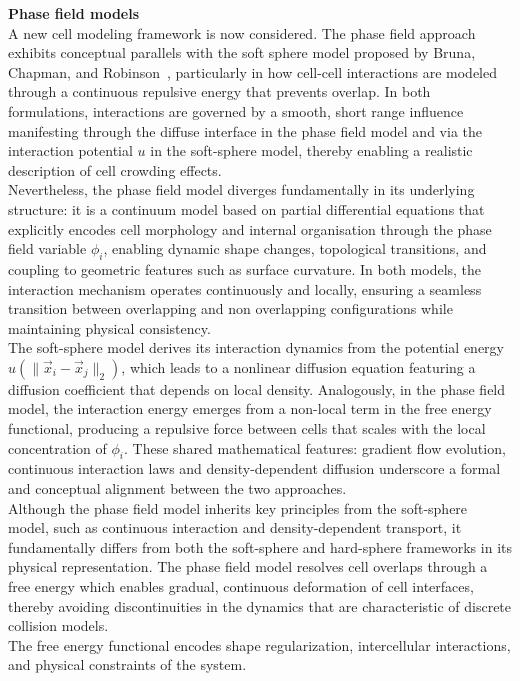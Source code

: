 \textbf{Phase field models} \\
A new cell modeling framework is now considered. 
The phase field approach exhibits conceptual parallels with the soft sphere model proposed by Bruna, Chapman, and Robinson~\cite{Bruna2017}, particularly in how cell-cell interactions are modeled through a continuous repulsive energy that prevents overlap. 
In both formulations, interactions are governed by a smooth, short range influence manifesting through the diffuse interface in the phase field model and via the interaction potential $u$ in the soft-sphere model, thereby enabling a realistic description of cell crowding effects. \\
Nevertheless, the phase field model diverges fundamentally in its underlying structure: it is a continuum model based on partial differential equations that explicitly encodes cell morphology and internal organisation through the phase field variable $\phi_i$, enabling dynamic shape changes, topological transitions, and coupling to geometric features such as surface curvature. 
In both models, the interaction mechanism operates continuously and locally, ensuring a seamless transition between overlapping and non overlapping configurations while maintaining physical consistency. \\
The soft-sphere model derives its interaction dynamics from the potential energy $u(\|\vec{x}_i - \vec{x}_j\|_2)$, which leads to a nonlinear diffusion equation featuring a diffusion coefficient that depends on local density. 
Analogously, in the phase field model, the interaction energy emerges from a non-local term in the free energy functional, producing a repulsive force between cells that scales with the local concentration of $\phi_i$. 
These shared mathematical features: gradient flow evolution, continuous interaction laws and density-dependent diffusion underscore a formal and conceptual alignment between the two approaches. \\
Although the phase field model inherits key principles from the soft-sphere model, such as continuous interaction and density-dependent transport, it fundamentally differs from both the soft-sphere and hard-sphere frameworks in its physical representation. 
The phase field model resolves cell overlaps through a free energy which enables gradual, continuous deformation of cell interfaces, thereby avoiding discontinuities in the dynamics that are characteristic of discrete collision models. \\
The free energy functional encodes shape regularization, intercellular interactions, and physical constraints of the system. 
